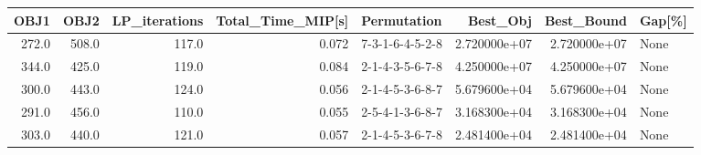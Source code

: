 \begin{tabular}{rrrrlrrl}
\toprule
  OBJ1 &   OBJ2 &  LP\_iterations &  Total\_Time\_MIP[s] &      Permutation &      Best\_Obj &    Best\_Bound & Gap[\%] \\
\midrule
 272.0 &  508.0 &          117.0 &              0.072 &  7-3-1-6-4-5-2-8 &  2.720000e+07 &  2.720000e+07 &   None \\
 344.0 &  425.0 &          119.0 &              0.084 &  2-1-4-3-5-6-7-8 &  4.250000e+07 &  4.250000e+07 &   None \\
 300.0 &  443.0 &          124.0 &              0.056 &  2-1-4-5-3-6-8-7 &  5.679600e+04 &  5.679600e+04 &   None \\
 291.0 &  456.0 &          110.0 &              0.055 &  2-5-4-1-3-6-8-7 &  3.168300e+04 &  3.168300e+04 &   None \\
 303.0 &  440.0 &          121.0 &              0.057 &  2-1-4-5-3-6-7-8 &  2.481400e+04 &  2.481400e+04 &   None \\
\bottomrule
\end{tabular}
